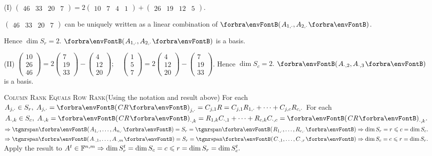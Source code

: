 \documentclass[a4paper, 11pt, UTF8]{article}
\begin{document}
\begin{large}
(I) {\normalsize$\begin{pmatrix} 46 & 33 & 20 & 7 \end{pmatrix}=2\begin{pmatrix} 10 & 7 & 4 & 1\end{pmatrix}+\begin{pmatrix} 26 & 19 & 12 & 5\end{pmatrix}$}.\vspace{3pt}\par\quad\HI
{\small$\begin{pmatrix} 46 & 33 & 20 & 7 \end{pmatrix}$} can be uniquely written as a linear combination of $\Par{A_{1,\cdot},A_{2,\cdot}}$.\vspace{3pt}\par\quad\HI
Hence $\dim S_r=2$. $\Par{A_{1,\cdot},A_{2,\cdot}}$ is a basis.\par\vspace{6pt}\quad\EndI
(II) {\normalsize$\begin{pmatrix} 10\\ 26\\ 46\end{pmatrix}=2\begin{pmatrix} 7\\ 19\\ 33\end{pmatrix}-\begin{pmatrix} 4\\ 12\\ 20\end{pmatrix}; \quad \begin{pmatrix} 1\\ 5\\ 7\end{pmatrix}=2\begin{pmatrix} 4\\ 12\\ 20\end{pmatrix}-\begin{pmatrix} 7\\ 19\\ 33\end{pmatrix}$}. \;Hence $\dim S_c=2.$ $\Par{A_{\cdot,2},A_{\cdot,3}}$ is a basis.\vspace{6pt}\par
\SepLine
\pagebreak

\BulletPointX\textsc{Column Rank Equals Row Rank}\quad (Using the notation and result above)\TextB{}
For each $A_{j,\cdot}\in S_r,\;A_{j,\cdot}=\Par{CR}_{j,\cdot}=C_{j,1}R=C_{j,1}R_{1,\cdot}+\dots+C_{j,c}R_{c,\cdot}$\TextB{}
For each $A_{\cdot,k}\in S_c,\;A_{\cdot,k}=\Par{CR}_{\cdot,k}=R_{1,k}C_{\cdot,1}+\dots+R_{c,k}C_{\cdot,c}=\Par{CR}_{\cdot,k}.$\TextB{}
$\Rightarrow\Span{A_{1,\cdot},\dots,A_{n,\cdot}}=S_r=\Span{R_{1,\cdot},\dots,R_{c,\cdot}}\Rightarrow\dim S_r=r\leqslant c=\dim S_c.$\TextB{}
$\Rightarrow\Span{A_{\cdot,1},\dots,A_{\cdot,m}}=S_r=\Span{C_{\cdot,1},\dots,C_{\cdot,r}}\Rightarrow\dim S_c=c\leqslant r=\dim S_r.$\TextB{}
\Or Apply the result to $A^t\in{\mathbb{F}}^{n,m}\Rightarrow\dim S_r^t=\dim S_c=c\leqslant r=\dim S_r=\dim S_c^t.$\PfEnd
\SepLine[10pt]


\end{large}
\end{document}
